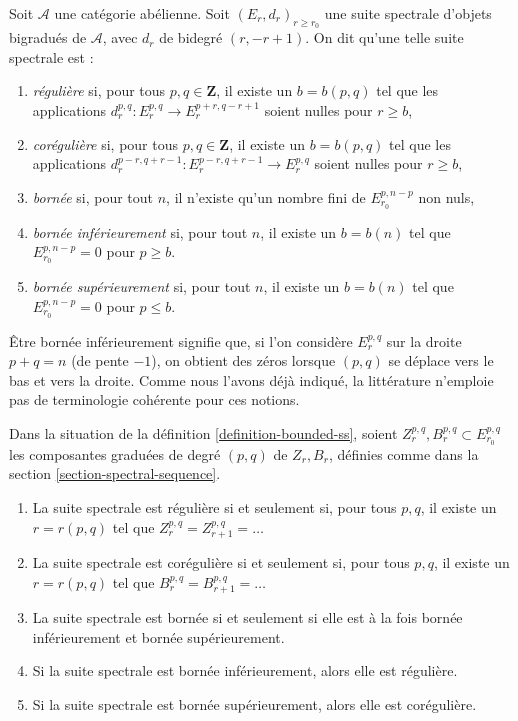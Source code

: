 \begin{definition}
\label{definition-bounded-ss}
Soit $\mathcal{A}$ une catégorie abélienne. Soit $(E_r, d_r)_{r \geq r_0}$
une suite spectrale d'objets bigradués de
$\mathcal{A}$, avec $d_r$ de bidegré $(r, -r + 1)$.
On dit qu'une telle suite spectrale est :
\begin{enumerate}
\item {\it régulière} si, pour tous $p, q \in \mathbf{Z}$, il existe
un $b = b(p, q)$ tel que les applications
$d_r^{p, q} : E_r^{p, q} \to E_r^{p + r, q - r + 1}$ soient nulles pour $r \geq b$,
\item {\it corégulière} si, pour tous $p, q \in \mathbf{Z}$, il existe un
$b = b(p, q)$ tel que les applications
$d_r^{p - r, q + r - 1} : E_r^{p - r, q + r - 1} \to E_r^{p, q}$
soient nulles pour $r \geq b$,
\item {\it bornée} si, pour tout $n$,
il n'existe qu'un nombre fini de $E_{r_0}^{p, n - p}$ non nuls,
\item {\it bornée inférieurement} si, pour tout $n$, il existe un $b = b(n)$ tel que
$E_{r_0}^{p, n - p} = 0$ pour $p \geq b$.
\item {\it bornée supérieurement} si, pour tout $n$, il existe un $b = b(n)$ tel que
$E_{r_0}^{p, n - p} = 0$ pour $p \leq b$.
\end{enumerate}
\end{definition}

\noindent
Être bornée inférieurement signifie que, si l'on considère $E_r^{p, q}$ sur la droite
$p + q = n$ (de pente $-1$), on obtient des zéros lorsque $(p, q)$
se déplace vers le bas et vers la droite.
Comme nous l'avons déjà indiqué, la littérature n'emploie pas de terminologie
cohérente pour ces notions.

\begin{lemma}
\label{lemma-relate-boundedness}
Dans la situation de la définition \ref{definition-bounded-ss},
soient $Z_r^{p, q}, B_r^{p, q} \subset E_{r_0}^{p, q}$ les
composantes graduées de degré $(p, q)$ de $Z_r, B_r$, définies comme dans la
section \ref{section-spectral-sequence}.
\begin{enumerate}
\item La suite spectrale est régulière si et seulement si, pour tous $p, q$,
il existe un $r = r(p, q)$ tel que
$Z_r^{p, q} = Z_{r + 1}^{p, q} = \ldots$
\item La suite spectrale est corégulière si et seulement si, pour tous $p, q$,
il existe un $r = r(p, q)$ tel que
$B_r^{p, q} = B_{r + 1}^{p, q} = \ldots$
\item La suite spectrale est bornée si et seulement si elle est à la fois
bornée inférieurement et bornée supérieurement.
\item Si la suite spectrale est bornée inférieurement, alors elle est régulière.
\item Si la suite spectrale est bornée supérieurement, alors elle est corégulière.
\end{enumerate}
\end{lemma}

